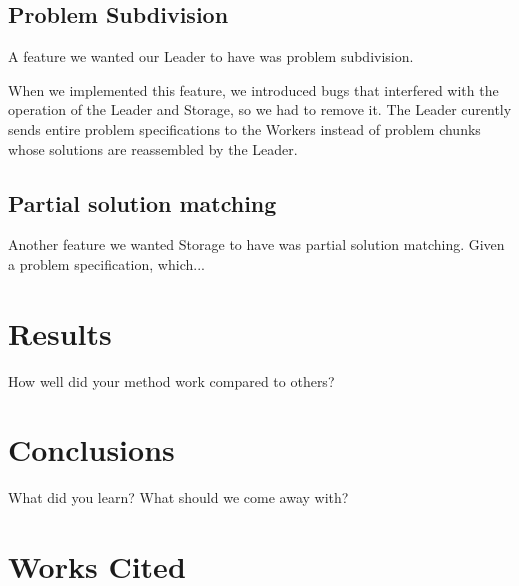 \documentclass[11pt]{article}
\begin{document}
\subsection{Problem Subdivision}

A feature we wanted our Leader to have was problem subdivision.

When we implemented this feature, we introduced bugs that interfered with the operation of the Leader and Storage, so we had to remove it. The Leader curently sends entire problem specifications to the Workers instead of problem chunks whose solutions are reassembled by the Leader.


\subsection{Partial solution matching}

Another feature we wanted Storage to have was partial solution matching. Given a problem specification, which...


\section{Results}

How well did your method work compared to others?

\section{Conclusions} 

What did you learn? What should we come away with?


\section{Works Cited}
\end{document}
